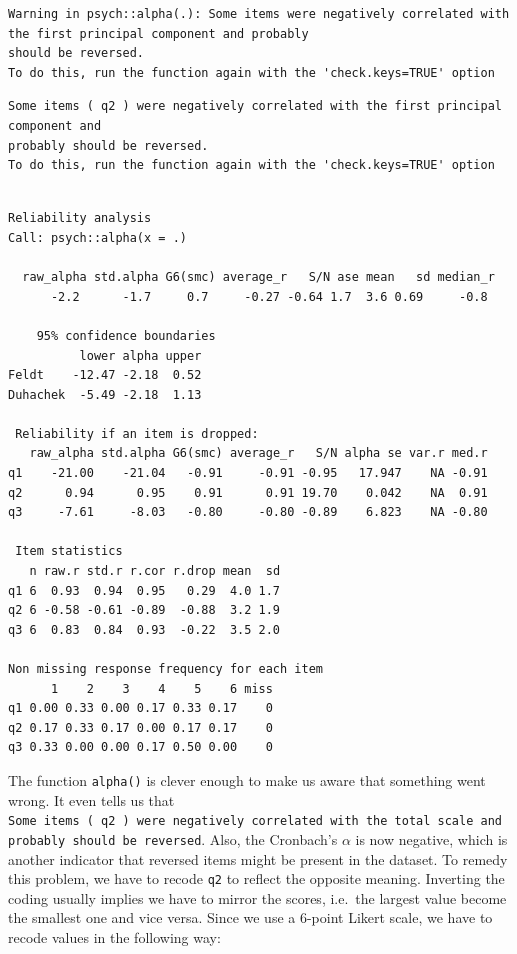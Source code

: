 \documentclass[
  letterpaper,
]{krantz}
\begin{document}
\begin{verbatim}
Warning in psych::alpha(.): Some items were negatively correlated with the first principal component and probably 
should be reversed.  
To do this, run the function again with the 'check.keys=TRUE' option
\end{verbatim}

\begin{verbatim}
Some items ( q2 ) were negatively correlated with the first principal component and 
probably should be reversed.  
To do this, run the function again with the 'check.keys=TRUE' option
\end{verbatim}

\begin{verbatim}

Reliability analysis   
Call: psych::alpha(x = .)

  raw_alpha std.alpha G6(smc) average_r   S/N ase mean   sd median_r
      -2.2      -1.7     0.7     -0.27 -0.64 1.7  3.6 0.69     -0.8

    95% confidence boundaries 
          lower alpha upper
Feldt    -12.47 -2.18  0.52
Duhachek  -5.49 -2.18  1.13

 Reliability if an item is dropped:
   raw_alpha std.alpha G6(smc) average_r   S/N alpha se var.r med.r
q1    -21.00    -21.04   -0.91     -0.91 -0.95   17.947    NA -0.91
q2      0.94      0.95    0.91      0.91 19.70    0.042    NA  0.91
q3     -7.61     -8.03   -0.80     -0.80 -0.89    6.823    NA -0.80

 Item statistics 
   n raw.r std.r r.cor r.drop mean  sd
q1 6  0.93  0.94  0.95   0.29  4.0 1.7
q2 6 -0.58 -0.61 -0.89  -0.88  3.2 1.9
q3 6  0.83  0.84  0.93  -0.22  3.5 2.0

Non missing response frequency for each item
      1    2    3    4    5    6 miss
q1 0.00 0.33 0.00 0.17 0.33 0.17    0
q2 0.17 0.33 0.17 0.00 0.17 0.17    0
q3 0.33 0.00 0.00 0.17 0.50 0.00    0
\end{verbatim}

The function \texttt{alpha()} is clever enough to make us aware that
something went wrong. It even tells us that
\texttt{Some\ items\ (\ q2\ )\ were\ negatively\ correlated\ with\ the\ total\ scale\ and\ probably\ should\ be\ reversed}.
Also, the Cronbach's \(\alpha\) is now negative, which is another
indicator that reversed items might be present in the dataset. To remedy
this problem, we have to recode \texttt{q2} to reflect the opposite
meaning. Inverting the coding usually implies we have to mirror the
scores, i.e.~the largest value become the smallest one and vice versa.
Since we use a 6-point Likert scale, we have to recode values in the
following way:
\end{document}
